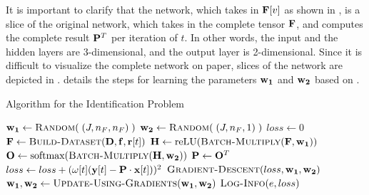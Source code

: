 It is important to clarify that the network, which takes in $\mathbf{F}[v]$ as shown in , is a slice of the original network, which takes in the complete tensor $\mathbf{F}$, and computes the complete result $\mathbf{P}^{T}$  per iteration of $t$. In other words, the input and the hidden layers are 3-dimensional, and the output layer is 2-dimensional. Since it is difficult to visualize the complete network on paper, slices of the network are depicted in .  details the steps for learning the parameters $\mathbf{w_1}$ and $\mathbf{w_2}$ based on .

\begin{algorithm}[!htbp]
    \caption{Algorithm for the Identification Problem} \label{alg:Algorithm for the Identification Problem}
    \begin{algorithmic}[1]
        \State $\matr{w_1} \gets \Call{Random}{\;(J,n_F,n_F)\;}$
        \State $\matr{w_2} \gets \Call{Random}{\;(J,n_F,1)\;}$
            \State $loss \gets 0$
                \State $\tens{F} \gets \Call{Build-Dataset}{\matr{D}, \matr{f}, \matr{r}[t]}$
                \State $\matr{H} \gets  \text{reLU}(\Call{Batch-Multiply}{\tens{F}, \matr{w_1}})$
                \State $\matr{O} \gets \text{softmax}(\Call{Batch-Multiply}{\matr{H}, \matr{w_2}})$
                \State $\mathbf{P} \gets \mathbf{O}^T$
                \State $loss \gets loss + (\omega[t](\mathbf{y}[t] - \mathbf{P} \cdot \mathbf{x}[t]))^2$
            \EndFor
            \State $\Call{Gradient-Descent}{loss, \matr{w_1}, \matr{w_2}}$
            \State $\matr{w_1}, \matr{w_2} \gets \Call{Update-Using-Gradients}{\matr{w_1}, \matr{w_2}}$
            \State $\Call{Log-Info}{e, loss}$
        \EndFor
    \end{algorithmic}
\end{algorithm}

